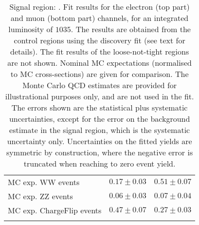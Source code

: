 \begin{table}
\begin{center}
{\begin{tabular*}{\textwidth}{@{\extracolsep{\fill}}lrr}
        MC exp. WW events         & $0.17 \pm 0.03$          & $0.51 \pm 0.07$              \\
        MC exp. ZZ events         & $0.06 \pm 0.03$          & $0.07 \pm 0.04$              \\
        MC exp. ChargeFlip events         & $0.47 \pm 0.07$          & $0.27 \pm 0.03$              \\
\noalign{\smallskip}\hline\noalign{\smallskip}
\end{tabular*}
}
\end{center}
\caption{Signal region: . Fit results for the electron (top part) and muon (bottom part) channels, for an integrated luminosity of $1035$.
The results are obtained from the control regions using the discovery fit (see text for details). The fit results of the loose-not-tight regions are not shown.
Nominal MC expectations (normalised to MC cross-sections) are given for comparison. 
The Monte Carlo QCD estimates are provided for illustrational purposes only, and are not used in the fit.
The errors shown are the statistical plus systematic uncertainties, except for the error on the background estimate in the signal region, which is the systematic uncertainty only.
Uncertainties on the fitted yields are symmetric by construction, 
where the negative error is truncated when reaching to zero event yield.
}
\label{table.results.systematics.in.logL.fit.table.results.yields}
\end{table}
%
